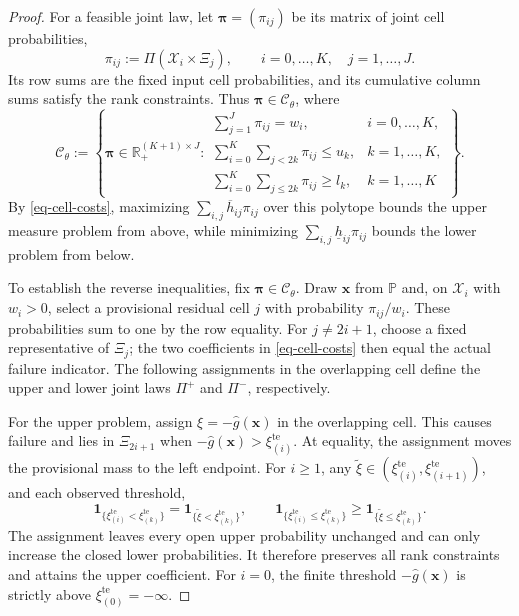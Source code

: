 \documentclass[review,11pt,3p,authoryear,nopreprintline]{elsarticle}
\begin{document}
\begin{proof}
  For a feasible joint law, let $\bm\pi=(\pi_{ij})$ be its matrix of joint cell probabilities,
  \begin{equation*}
    \pi_{ij}:=\Pi(\mathcal X_i\times\Xi_j),
    \qquad i=0,\ldots,K,\quad j=1,\ldots,J.
  \end{equation*}
  Its row sums are the fixed input cell probabilities, and its cumulative column sums satisfy the rank constraints. Thus $\bm\pi\in\mathcal C_\theta$, where
  \begin{equation}
    \mathcal C_\theta:=
    \left\{\bm\pi\in\mathbb R_+^{(K+1)\times J}:
    \begin{array}{ll}
      \displaystyle\sum_{j=1}^J\pi_{ij}=w_i,
        &i=0,\ldots,K,\\[1mm]
      \displaystyle\sum_{i=0}^K\sum_{j<2k}\pi_{ij}\le u_k,
        &k=1,\ldots,K,\\[1mm]
      \displaystyle\sum_{i=0}^K\sum_{j\le2k}\pi_{ij}\ge l_k,
        &k=1,\ldots,K
    \end{array}\right\}.
    \label{eq-cell-mass-polytope}
  \end{equation}
  By \eqref{eq-cell-costs}, maximizing $\sum_{i,j}\overline h_{ij}\pi_{ij}$ over this polytope bounds the upper measure problem from above, while minimizing $\sum_{i,j}\underline h_{ij}\pi_{ij}$ bounds the lower problem from below.

  To establish the reverse inequalities, fix $\bm\pi\in\mathcal C_\theta$. Draw $\bm x$ from $\mathbb P$ and, on $\mathcal X_i$ with $w_i>0$, select a provisional residual cell $j$ with probability $\pi_{ij}/w_i$. These probabilities sum to one by the row equality. For $j\ne2i+1$, choose a fixed representative of $\Xi_j$; the two coefficients in \eqref{eq-cell-costs} then equal the actual failure indicator. The following assignments in the overlapping cell define the upper and lower joint laws $\Pi^+$ and $\Pi^-$, respectively.

  For the upper problem, assign $\xi=-\hat g(\bm x)$ in the overlapping cell. This causes failure and lies in $\Xi_{2i+1}$ when $-\hat g(\bm x)>\xi_{(i)}^{\mathrm{te}}$. At equality, the assignment moves the provisional mass to the left endpoint. For $i\ge1$, any $\widetilde\xi\in\left(\xi_{(i)}^{\mathrm{te}},\xi_{(i+1)}^{\mathrm{te}}\right)$, and each observed threshold,
  \begin{equation*}
    \mathbf1_{\{\xi_{(i)}^{\mathrm{te}}<\xi_{(k)}^{\mathrm{te}}\}}=\mathbf1_{\{\widetilde\xi<\xi_{(k)}^{\mathrm{te}}\}},\qquad
    \mathbf1_{\{\xi_{(i)}^{\mathrm{te}}\le \xi_{(k)}^{\mathrm{te}}\}}\ge\mathbf1_{\{\widetilde\xi\le \xi_{(k)}^{\mathrm{te}}\}}.
  \end{equation*}
  The assignment leaves every open upper probability unchanged and can only increase the closed lower probabilities. It therefore preserves all rank constraints and attains the upper coefficient. For $i=0$, the finite threshold $-\hat g(\bm x)$ is strictly above $\xi_{(0)}^{\mathrm{te}}=-\infty$.


\end{proof}
\end{document}
